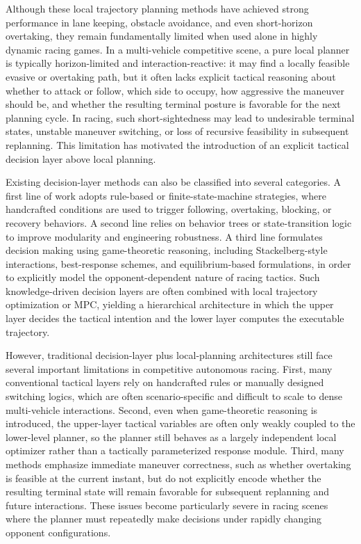 \documentclass[final ,3p, times]{elsarticle}
\begin{document}
Although these local trajectory planning methods have achieved strong performance in lane keeping, obstacle avoidance, and even short-horizon overtaking, they remain fundamentally limited when used alone in highly dynamic racing games. In a multi-vehicle competitive scene, a pure local planner is typically horizon-limited and interaction-reactive: it may find a locally feasible evasive or overtaking path, but it often lacks explicit tactical reasoning about whether to attack or follow, which side to occupy, how aggressive the maneuver should be, and whether the resulting terminal posture is favorable for the next planning cycle. In racing, such short-sightedness may lead to undesirable terminal states, unstable maneuver switching, or loss of recursive feasibility in subsequent replanning. This limitation has motivated the introduction of an explicit tactical decision layer above local planning. \cite{liniger2021survey,reiter2024hrlmpc,hu2025survey}

Existing decision-layer methods can also be classified into several categories. A first line of work adopts rule-based or finite-state-machine strategies, where handcrafted conditions are used to trigger following, overtaking, blocking, or recovery behaviors. A second line relies on behavior trees or state-transition logic to improve modularity and engineering robustness. A third line formulates decision making using game-theoretic reasoning, including Stackelberg-style interactions, best-response schemes, and equilibrium-based formulations, in order to explicitly model the opponent-dependent nature of racing tactics. Such knowledge-driven decision layers are often combined with local trajectory optimization or MPC, yielding a hierarchical architecture in which the upper layer decides the tactical intention and the lower layer computes the executable trajectory. \cite{hu2025survey,reiter2024hrlmpc,liniger2021survey}

However, traditional decision-layer plus local-planning architectures still face several important limitations in competitive autonomous racing. First, many conventional tactical layers rely on handcrafted rules or manually designed switching logics, which are often scenario-specific and difficult to scale to dense multi-vehicle interactions. Second, even when game-theoretic reasoning is introduced, the upper-layer tactical variables are often only weakly coupled to the lower-level planner, so the planner still behaves as a largely independent local optimizer rather than a tactically parameterized response module. Third, many methods emphasize immediate maneuver correctness, such as whether overtaking is feasible at the current instant, but do not explicitly encode whether the resulting terminal state will remain favorable for subsequent replanning and future interactions. These issues become particularly severe in racing scenes where the planner must repeatedly make decisions under rapidly changing opponent configurations. \cite{hu2025survey,reiter2024hrlmpc,liniger2021survey}
\end{document}
